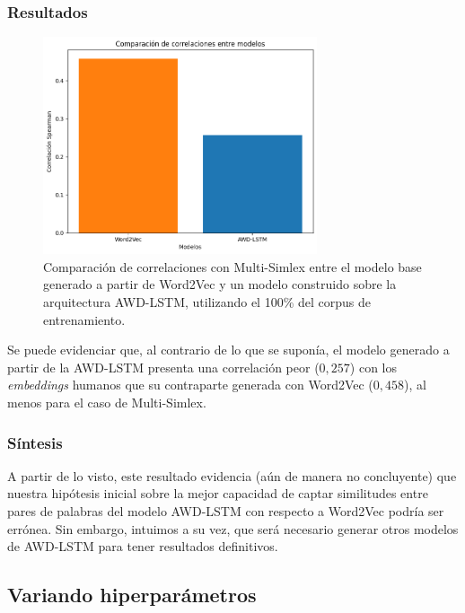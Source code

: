 \subsubsection{Resultados}

\begin{figure}[H]
    \centering
    \includegraphics[width=0.72\textwidth]{imagenes/comparacion_w2v_lstm.png}
    \caption{Comparación de correlaciones con Multi-Simlex entre el modelo base 
    generado a partir de Word2Vec y un modelo construido sobre la arquitectura AWD-LSTM, 
    utilizando el 100\% del corpus de entrenamiento.}
    \label{fig:comparacion_w2v_lstm}
\end{figure}

Se puede evidenciar que, al contrario de lo que se suponía, el modelo generado a partir 
de la AWD-LSTM presenta una correlación peor ($0,257$) con los \textit{embeddings} humanos que su 
contraparte generada con Word2Vec ($0,458$), al menos para el caso de Multi-Simlex.

\subsubsection{Síntesis}

A partir de lo visto, este resultado evidencia (aún de manera no concluyente) que nuestra 
hipótesis inicial sobre la mejor capacidad de captar similitudes entre pares de palabras 
del modelo AWD-LSTM con respecto a Word2Vec podría ser errónea. Sin embargo, 
intuimos a su vez, que será necesario generar otros modelos de AWD-LSTM para tener 
resultados definitivos.

\subsection{Variando hiperparámetros}

